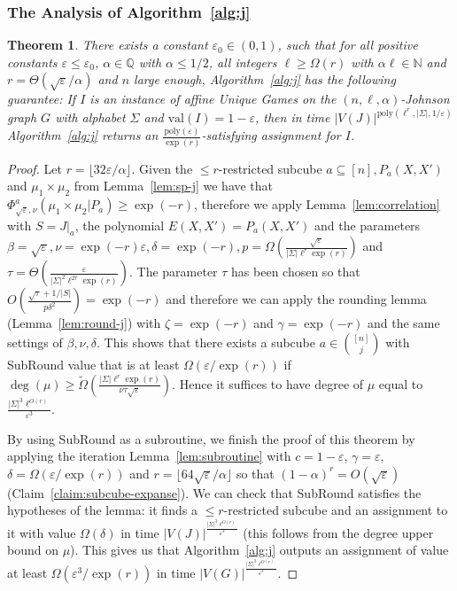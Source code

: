 \documentclass[11pt]{article}
\def \Q {{\mathbb Q}}
\def \N {\mathbb{N}}
\def \poly {\mathrm{poly}}
\def \eps {{\varepsilon}}
\def \val {\mathrm{val}}
\newtheorem{theorem}{Theorem}[section]
\theoremstyle{definition}
\begin{document}
\subsubsection{The Analysis of Algorithm~\ref{alg:j}}\label{sec:combine_analysis}

\begin{theorem}\label{thm:main-johnson}
There exists a constant $\eps_0 \in (0,1)$, such that for all positive constants $\eps \leq \eps_0$, $\alpha \in \Q$ with $\alpha \leq 1/2$, all integers $\ell \geq \Omega(r)$ with $\alpha \ell \in \N$ and $r = \Theta(\sqrt{\eps}/\alpha)$ and $n$ large enough, Algorithm~\ref{alg:j} has the following guarantee: If $I$ is an instance of affine Unique Games on the $(n,\ell,\alpha)$-Johnson graph $G$ with alphabet $\Sigma$ and $\val(I) = 1 - \eps$, then in time $|V(J)|^{\poly(\ell^r,|\Sigma|,1/\eps)}$ 
Algorithm~\ref{alg:j} returns an $\frac{\poly(\eps)}{\exp(r)}$-satisfying assignment for $I$.
\end{theorem}

\begin{proof}
Let $r = \lfloor 32\eps/\alpha\rfloor$. Given the $\leq r$-restricted subcube $a \subseteq [n], P_a(X,X')$ and $\mu_1 \times \mu_2$ from Lemma~\ref{lem:sp-j} we have that $\Phi_{\sqrt{\eps},\nu}^a(\mu_1 \times \mu_2| P_a) \geq \exp(-r)$, therefore we apply Lemma~\ref{lem:correlation} with $S = J|_a$, the polynomial  $E(X,X') = P_a(X,X')$ and the parameters $\beta = \sqrt{\eps}, \nu = \exp(-r)\eps, \delta = \exp(-r), p = \Omega\left(\frac{\sqrt{\eps}}{|\Sigma|\ell^{r}\exp(r)}\right)$ and $\tau = \Theta(\frac{\eps}{|\Sigma|^2\ell^{2r}\exp(r)})$. The parameter $\tau$ has been chosen so that $O(\frac{\sqrt{\tau}+1/|S|}{p\delta^2}) = \exp(-r)$ and therefore we can apply the rounding lemma (Lemma~\ref{lem:round-j}) with $\zeta = \exp(-r)$ and $\gamma = \exp(-r)$ and the same settings of $\beta, \nu, \delta$. This shows that there exists a subcube $a \in {[n] \choose j}$ with SubRound value that is at least $\Omega(\eps/\exp(r))$ if $\deg(\mu) \geq \widetilde{\Omega}\left(\frac{|\Sigma|\ell^r\exp(r)}{\nu\tau\sqrt{\eps}}\right)$. Hence it suffices to have degree of $\mu$ equal to $\frac{|\Sigma|^3\ell^{O(r)}}{\eps^3}$.

By using SubRound as a subroutine, we finish the proof of this theorem by applying the iteration Lemma~\ref{lem:subroutine} with $c=1-\eps$, $\gamma = \eps$, $\delta = \Omega(\eps/\exp(r))$ and $r = \lfloor 64\sqrt{\eps}/\alpha \rfloor$ so that $(1-\alpha)^r = O(\sqrt{\eps})$ (Claim~\ref{claim:subcube-expanse}). We can check that SubRound satisfies the hypotheses of the lemma: it finds a $\le r$-restricted subcube and an assignment to it with value $\Omega(\delta)$ in time $|V(J)|^{\frac{|\Sigma|^3\ell^{O(r)}}{\eps^3}}$ (this follows from the degree upper bound on $\mu$).
This gives us that Algorithm~\ref{alg:j} outputs an assignment of value at least $\Omega(\eps^3/\exp(r))$ in time $|V(G)|^{\frac{|\Sigma|^3\ell^{O(r)}}{\eps^3}}$.
\end{proof}
\end{document}

